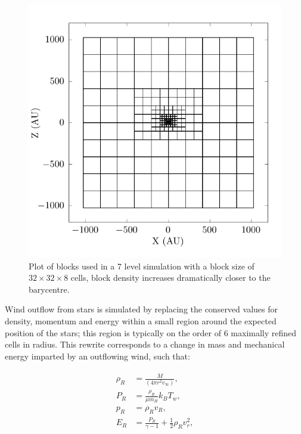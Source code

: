 \begin{figure}
  \centering
  \includegraphics{assets/mesh/gridxy.pdf}
  \caption[Static mesh refinement example]{Plot of blocks used in a 7 level simulation with a block size of $32\times 32 \times 8$ cells, block density increases dramatically closer to the barycentre.}
  \label{fig:smr-grid}
\end{figure}

Wind outflow from stars is simulated by replacing the conserved values for density, momentum and energy within a small region around the expected position of the stars; this region is typically on the order of 6 maximally refined cells in radius.
This rewrite corresponds to a change in mass and mechanical energy imparted by an outflowing wind, such that:

\begin{subequations}
  \begin{align}
    \rho_R & = \frac{\dot M}{(4 \pi r^2 v_\infty)} , \\
    P_R & = \frac{\rho_R}{\mu m_H} k_B T_w , \\
    p_{R} & = \rho_R v_{R} , \\
    E_R & = \frac{P_R}{\gamma - 1} + \frac{1}{2} \rho_{R} v_{r}^2 ,
  \end{align}
\end{subequations}

